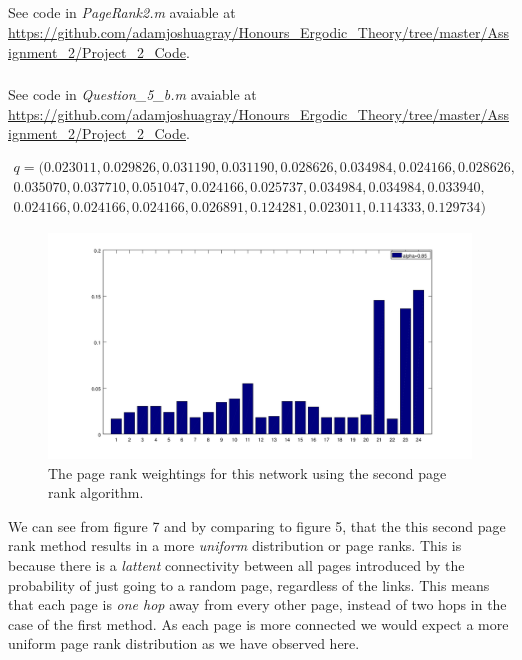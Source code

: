 \documentclass{unswmaths}
\begin{document}
\subsection{}
\subsubsection{}
See code in \emph{PageRank2.m} avaiable at \url{https://github.com/adamjoshuagray/Honours_Ergodic_Theory/tree/master/Assignment_2/Project_2_Code}. 
\subsubsection{}
See code in \emph{Question\_5\_b.m} avaiable at \url{https://github.com/adamjoshuagray/Honours_Ergodic_Theory/tree/master/Assignment_2/Project_2_Code}. 

\begin{align*}
    q = (
   0.023011,
   0.029826,
   0.031190,
   0.031190,
   0.028626,
   0.034984,
   0.024166,
   0.028626, \\
   0.035070,
   0.037710,
   0.051047,
   0.024166,
   0.025737,
   0.034984,
   0.034984,
   0.033940, \\
   0.024166,
   0.024166,
   0.024166,
   0.026891,
   0.124281,
   0.023011,
   0.114333,
   0.129734
)
\end{align*}
\begin{figure}[h]
    \includegraphics[scale=0.4]{Second_Rank}
    \caption{The page rank weightings for this network using the second page rank algorithm.}
\end{figure}


We can see from figure 7 and by comparing to figure 5, that the this second page rank method results in a more \emph{uniform} distribution or page ranks. This is because there is a \emph{lattent} connectivity between all pages introduced by the probability of just going to a random page, regardless of the links. This means that each page is \emph{one hop} away from every other page, instead of two hops in the case of the first method. As each page is more connected we would expect a more uniform page rank distribution as we have observed here.
\end{document}
